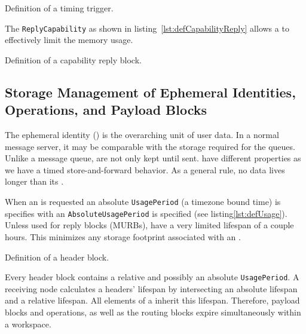 \begin{lstfloat}[ht]
	
	\caption{Definition of a timing trigger.}
	\label{lst:defUsage}
\end{lstfloat}

The \texttt{ReplyCapability} as shown in listing~\ref{lst:defCapabilityReply} allows a \VortexNode{} to effectively limit the memory usage. 
\begin{lstfloat}[ht]
	
	\caption{Definition of a capability reply block.}
	\label{lst:defCapabilityReply}
\end{lstfloat}


\subsection{Storage Management of Ephemeral Identities,  Operations, and Payload Blocks}
The ephemeral identity () is the overarching unit of user data. In a normal message server, it may be comparable with the storage required for the queues. Unlike a message queue, \VortexMessages{} are not only kept until sent. \VortexMessages{} have different properties as we have a timed store-and-forward behavior. As a general rule, no data lives longer than its .

When an  is requested an absolute \texttt{UsagePeriod} (a timezone bound time) is specifies with an \texttt{AbsoluteUsagePeriod} is specified (see listing\ref{lst:defUsage}). Unless used for reply blocks (MURBs),  have a very limited lifespan of a couple hours. This minimizes any storage footprint associated with an . 

\begin{lstfloat}[ht]
	
	\caption{Definition of a header block.}
	\label{lst:defHeaderBlock}
\end{lstfloat}

Every header block contains a relative and possibly an absolute \texttt{UsagePeriod}. A receiving node calculates a headers' lifespan by intersecting an absolute lifespan and a relative lifespan. All elements of a \VortexMessage{} inherit this lifespan. Therefore, payload blocks and operations, as well as the routing blocks expire simultaneously within a workspace.

